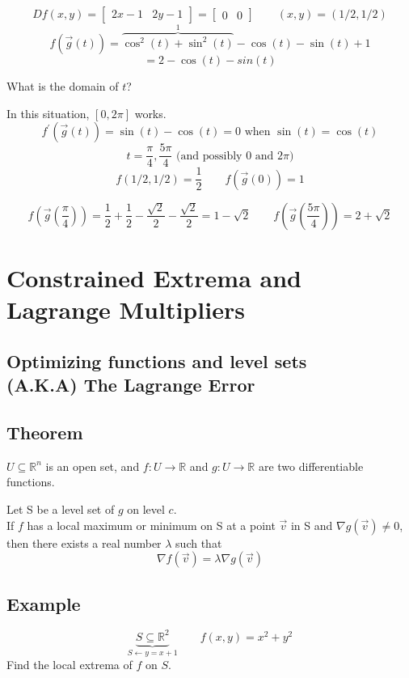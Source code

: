 \documentclass{article}
\begin{document}
\[Df(x,y) = \begin{bmatrix}
    2x-1&2y-1
\end{bmatrix}=\begin{bmatrix}
    0&0
\end{bmatrix}\qquad (x,y)=(1/2,1/2)\]
\[f(\vec{g}(t))=\overbrace{\cos^{2}(t)+\sin^{2}(t)}^{1}-\cos(t)-\sin(t)+1\]
\[=2-\cos(t)-sin(t)\]

What is the domain of $t$?

In this situation, $[0,2\pi]$ works.
\[f^\prime (\vec{g}(t))=\sin(t)-\cos(t)=0\mbox{  when $\sin(t)=\cos(t)$}\]
\[t=\frac{\pi}{4},\frac{5\pi}{4}\mbox{ (and possibly $0$ and $2\pi$)}\]
\[f(1/2,1/2)=\frac{1}{2}\qquad f(\vec{g}(0))=1\]

\[f(\vec{g}(\frac{\pi}{4}))=\frac{1}{2}+\frac{1}{2}-\frac{\sqrt{2}}{2}-\frac{\sqrt{2}}{2}=1-\sqrt{2}\qquad f(\vec{g}(\frac{5\pi}{4}))=2+\sqrt{2}\]

\section{Constrained Extrema and \\Lagrange Multipliers}
\subsection*{Optimizing functions and level sets \\
(A.K.A) The Lagrange Error}

\subsection*{Theorem}
$U\subseteq\mathbb{R}^n$ is an open set, and $f:U\rightarrow\mathbb{R}$ and $g:U\rightarrow\mathbb{R}$ are two differentiable functions.


Let S be a level set of $g$ on level $c$.\\

If $f$ has a local maximum or minimum on S at a point $\vec{v}$ in S and $\nabla g(\vec{v})\neq 0$, then there exists a real number $\lambda$ such that 
\[\nabla f(\vec{v})=\lambda \nabla g(\vec{v})\]

\subsection*{Example}
\[\underbrace{S\subseteq\mathbb{R}^2}_{S\leftarrow y=x+1}\qquad f(x,y)=x^2+y^2\]
Find the local extrema of $f$ on $S$.
\end{document}
